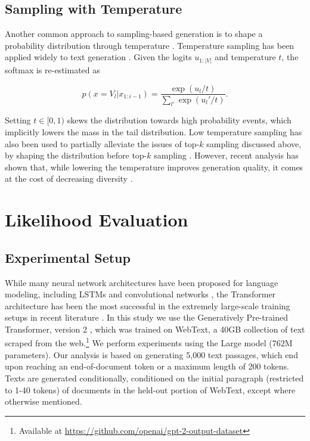 \subsection{Sampling with Temperature}

Another common approach to sampling-based generation is to shape a probability distribution through temperature \citep{ackley1985learning}. Temperature sampling has been applied widely to text generation \citep{ficler2017controlling,fan2018hierarchical,caccia2018GANs}. Given the logits $u_{1:|V|}$ and temperature $t$, the softmax is re-estimated as

\begin{equation}
    p(x = V_l | x_{1:i-1}) = \frac {\exp(u_l/ t)} {\sum_{l'} \exp(u_l'/ t)}.
\end{equation}

Setting $t \in [0,1)$ skews the distribution towards high probability events, which implicitly lowers the mass in the tail distribution. Low temperature sampling has also been used to partially alleviate the issues of top-$k$ sampling discussed above, by shaping the distribution before top-$k$ sampling \citep{radford2018improving,fan2018hierarchical}. However, recent analysis has shown that, while lowering the temperature improves generation quality, it comes at the cost of decreasing diversity \citep{caccia2018GANs,hashimoto20190unifying}.

 \section{Likelihood Evaluation}
\label{sec:likelihood}

\subsection{Experimental Setup}

\label{ssec:setup}

While many neural network architectures have been proposed for language modeling, including LSTMs \citep{sundermeyer2012lstm} and convolutional networks \citep{dauphin2017language}, the Transformer architecture \citep{vaswani2017attention} has been the most successful in the extremely large-scale training setups in recent literature \citep{radford2018improving,radford2019BetterLMs}. In this study we use the Generatively Pre-trained Transformer, version 2
\citep[GPT2;][]{radford2019BetterLMs}, which was trained on WebText, a 40GB collection of text scraped from the web.\footnote{Available at \url{https://github.com/openai/gpt-2-output-dataset}}
We perform experiments using the Large model (762M parameters). Our analysis is based on generating 5,000 text passages, which end upon reaching an end-of-document token or a maximum length of 200 tokens. Texts are generated conditionally, conditioned on the initial paragraph (restricted to 1-40 tokens) of documents in the held-out portion of WebText, except where otherwise mentioned.

